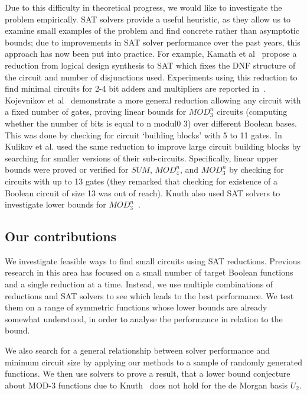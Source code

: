 \documentclass{article}
\begin{document}
Due to this difficulty in theoretical progress, we would like to investigate the problem empirically. SAT solvers provide a useful heuristic, as they allow us to examine small examples of the problem and find concrete rather than asymptotic bounds; due to improvements in SAT solver performance over the past years, this approach has now been put into practice. For example, Kamath et al~\cite{kamath} propose a reduction from logical design synthesis to SAT which fixes the DNF structure of the circuit and number of disjunctions used. Experiments using this reduction to find minimal circuits for 2-4 bit adders and multipliers are reported in~\cite{estrada}. Kojevnikov et al~\cite{kulikov} demonstrate a more general reduction allowing any circuit with a fixed number of gates, proving linear bounds for \(MOD^n_3\) circuits (computing whether the number of bits is equal to n modul0 3) over different Boolean bases. This was done by checking for circuit `building blocks' with 5 to 11 gates. In~\cite{kulikovlocal} Kulikov et al. used the same reduction to improve large circuit building blocks by searching for smaller versions of their sub-circuits. Specifically, linear upper bounds were proved or verified for \(SUM\), \(MOD^n_4\), and \(MOD^n_3\) by checking for circuits with up to 13 gates (they remarked that checking for existence of a Boolean circuit of size 13 was out of reach). Knuth also used SAT solvers to investigate lower bounds for \(MOD^n_3\)~\cite{knuth15}.

\subsection{Our contributions}

We investigate feasible ways to find small circuits using SAT reductions. Previous research in this area has focused on a small number of target Boolean functions and a single reduction at a time. Instead, we use multiple combinations of reductions and SAT solvers to see which leads to the best performance. We test them on a range of symmetric functions whose lower bounds are already somewhat understood, in order to analyse the performance in relation to the bound. 

We also search for a general relationship between solver performance and minimum circuit size by applying our methods to a sample of randomly generated functions. We then use solvers to prove a result, that a lower bound conjecture about MOD-3 functions due to Knuth~\cite{knuth15} does not hold for the de Morgan basis $U_2$. 
\end{document}
